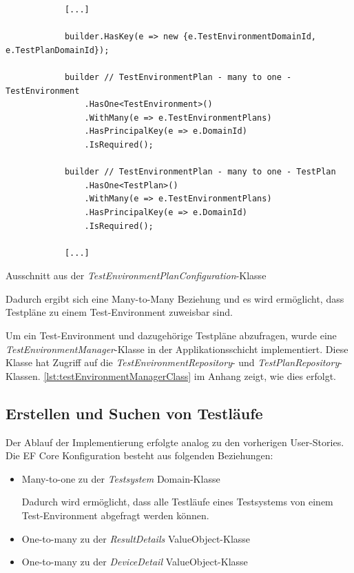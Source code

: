 \documentclass[a4paper, fontsize=11pt, parskip=half, twoside]{scrreprt}
\begin{document}
	\begin{listing}[ht]
		\begin{verbatim}
			[...]	
					
			builder.HasKey(e => new {e.TestEnvironmentDomainId, e.TestPlanDomainId});
			
			builder // TestEnvironmentPlan - many to one - TestEnvironment
				.HasOne<TestEnvironment>()
				.WithMany(e => e.TestEnvironmentPlans)
				.HasPrincipalKey(e => e.DomainId)
				.IsRequired();
				
			builder // TestEnvironmentPlan - many to one - TestPlan
				.HasOne<TestPlan>()
				.WithMany(e => e.TestEnvironmentPlans)
				.HasPrincipalKey(e => e.DomainId)
				.IsRequired();	
					
			[...]
		\end{verbatim}
		\caption{Ausschnitt aus der \emph{TestEnvironmentPlanConfiguration}-Klasse}
		\label{lst:testEnvironmentPlanConfigurationClass}
	\end{listing}
	
	Dadurch ergibt sich eine Many-to-Many Beziehung und es wird ermöglicht, dass Testpläne zu einem Test-Environment zuweisbar sind.
	
	Um ein Test-Environment und dazugehörige Testpläne abzufragen, wurde eine \emph{TestEnvironmentManager}-Klasse in der Applikationsschicht implementiert.
	Diese Klasse hat Zugriff auf die \emph{TestEnvironmentRepository}- und \emph{TestPlanRepository}-Klassen.
	\autoref{lst:testEnvironmentManagerClass} im Anhang zeigt, wie dies erfolgt.
	
	\subsection{Erstellen und Suchen von Testläufe} \label{subsec:createAndSearchTestruns}
	
	Der Ablauf der Implementierung erfolgte analog zu den vorherigen User-Stories.
	Die \ac{EF} Core Konfiguration besteht aus folgenden Beziehungen:
	
	\begin{itemize}
		\item Many-to-one zu der \emph{Testsystem} Domain-Klasse
		
		Dadurch wird ermöglicht, dass alle Testläufe eines Testsystems von einem Test-Environment abgefragt werden können.
		
		\item One-to-many zu der \emph{ResultDetails} ValueObject-Klasse
		\item One-to-many zu der \emph{DeviceDetail} ValueObject-Klasse
	\end{itemize}
	
\end{document}
